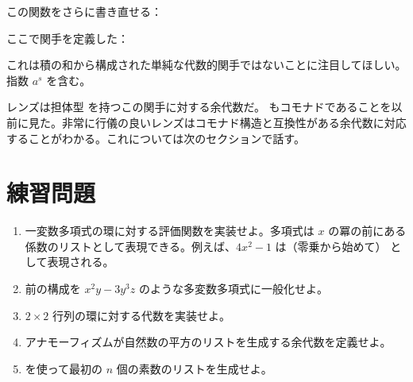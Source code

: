 この関数をさらに書き直せる：

ここで関手を定義した：

これは積の和から構成された単純な代数的関手ではないことに注目してほしい。指数 $a^s$ を含む。

レンズは担体型  を持つこの関手に対する余代数だ。 もコモナドであることを以前に見た。非常に行儀の良いレンズはコモナド構造と互換性がある余代数に対応することがわかる。これについては次のセクションで話す。

\section{練習問題}

\begin{enumerate}
  \tightlist
  \item
        一変数多項式の環に対する評価関数を実装せよ。多項式は $x$ の冪の前にある係数のリストとして表現できる。例えば、$4x^2-1$ は（零乗から始めて）\code{{[}-1, 0, 4{]}} として表現される。
  \item
        前の構成を $x^2y-3y^3z$ のような多変数多項式に一般化せよ。
  \item
        $2\times{}2$ 行列の環に対する代数を実装せよ。
  \item
        アナモーフィズムが自然数の平方のリストを生成する余代数を定義せよ。
  \item
         を使って最初の $n$ 個の素数のリストを生成せよ。
\end{enumerate}
